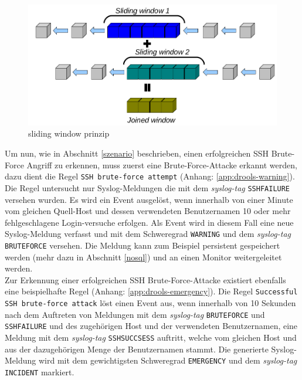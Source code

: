 \begin{figure}[htbp]
    \caption{sliding window prinzip}
    \label{pic:drools}\vspace{0.2cm}
    \centering
    \includegraphics[scale=0.36]{img/drools-slide-00}
    
\end{figure}

Um nun, wie in Abschnitt \ref{szenario} beschrieben, einen erfolgreichen SSH Brute-Force 
Angriff zu erkennen, muss zuerst eine Brute-Force-Attacke erkannt werden, dazu dient die 
Regel \texttt{SSH brute-force attempt} (Anhang: \ref{app:drools-warning}). Die Regel 
untersucht nur Syslog-Meldungen die mit dem \textit{syslog-tag} \texttt{SSHFAILURE} 
versehen wurden. Es wird ein Event ausgelöst, wenn innerhalb von einer Minute vom 
gleichen Quell-Host und dessen verwendeten Benutzernamen 10 oder mehr fehlgeschlagene 
Login-versuche erfolgen. Als Event wird in diesem Fall eine neue Syslog-Meldung verfasst 
und mit dem Schweregrad \texttt{WARNING} und dem \textit{syslog-tag} \texttt{BRUTEFORCE} 
versehen. Die Meldung kann zum Beispiel persistent gespeichert werden (mehr dazu in 
Abschnitt \ref{nosql}) und an einen Monitor weitergeleitet werden.\\

Zur Erkennung einer erfolgreichen SSH Brute-Force-Attacke existiert ebenfalls eine 
beispielhafte Regel (Anhang: \ref{app:drools-emergency}). Die Regel \texttt{Successful 
SSH brute-force attack} löst einen Event aus, wenn innerhalb von 10 Sekunden nach dem 
Auftreten von Meldungen mit dem \textit{syslog-tag} \texttt{BRUTEFORCE} und 
\texttt{SSHFAILURE} und des zugehörigen Host und der verwendeten Benutzernamen, eine 
Meldung mit dem \textit{syslog-tag} \texttt{SSHSUCCSESS} auftritt, welche vom 
gleichen Host und aus der dazugehörigen Menge der Benutzernamen stammt.
Die generierte Syslog-Meldung wird mit dem gewichtigsten Schweregrad \texttt{EMERGENCY} 
und dem \textit{syslog-tag} \texttt{INCIDENT} markiert.\\

